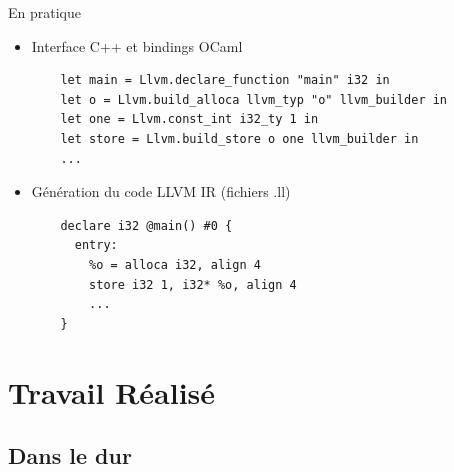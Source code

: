 \documentclass{beamer} %
\begin{document}
\begin{frame}[fragile]{En pratique}
    \vfill
    \begin{itemize}
        \vfill\item Interface C++ et bindings OCaml
        \begin{verbatim}
    let main = Llvm.declare_function "main" i32 in
    let o = Llvm.build_alloca llvm_typ "o" llvm_builder in
    let one = Llvm.const_int i32_ty 1 in
    let store = Llvm.build_store o one llvm_builder in
    ...
        \end{verbatim}

        \vfill\item
        Génération du code LLVM IR (fichiers .ll)
        \begin{verbatim}
    declare i32 @main() #0 {
      entry:
        %o = alloca i32, align 4
        store i32 1, i32* %o, align 4
        ...
    }
        \end{verbatim}
    \end{itemize}
\vfill
\end{frame}

\section{Travail Réalisé}

\begin{frame}
    \tableofcontents[currentsection]
\end{frame}

\subsection{Dans le dur}
\end{document}

